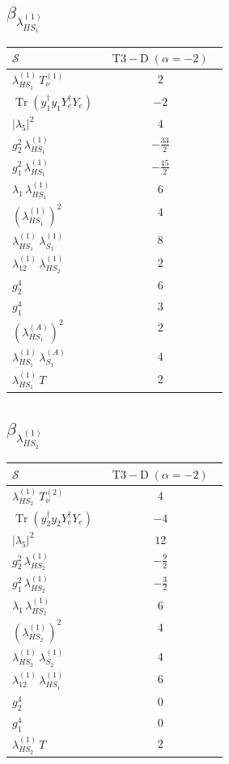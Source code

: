 \documentclass[9pt]{article}
\begin{document}
\subsection*{$ \beta_{\lambda_{HS_1}^{(1)}} $}
\begin{longtable}{@{}p{0.31\linewidth}c@{}}
\toprule
$\mathcal{S}$ & $ \mathrm{T3-D}\;(\alpha=-2) $ \\
\midrule
$ \lambda_{HS_1}^{(1)}\,T_{\nu}^{(1)} $ & $ 2 $ \\
$ \operatorname{Tr}(y_1^\dagger y_1Y_e^\dagger Y_e) $ & $ -2 $ \\
$ |\lambda_5|^2 $ & $ 4 $ \\
$ g_2^2\,\lambda_{HS_1}^{(1)} $ & $ - \frac{33}{2} $ \\
$ g_1^2\,\lambda_{HS_1}^{(1)} $ & $ - \frac{15}{2} $ \\
$ \lambda_1\,\lambda_{HS_1}^{(1)} $ & $ 6 $ \\
$ \left(\lambda_{HS_1}^{(1)}\right)^2 $ & $ 4 $ \\
$ \lambda_{HS_1}^{(1)}\,\lambda_{S_1}^{(1)} $ & $ 8 $ \\
$ \lambda_{12}^{(1)}\,\lambda_{HS_2}^{(1)} $ & $ 2 $ \\
$ g_2^4 $ & $ 6 $ \\
$ g_1^4 $ & $ 3 $ \\
$ \left(\lambda_{HS_1}^{(A)}\right)^2 $ & $ 2 $ \\
$ \lambda_{HS_1}^{(1)}\,\lambda_{S_1}^{(A)} $ & $ 4 $ \\
$ \lambda_{HS_1}^{(1)}\,T $ & $ 2 $ \\
\bottomrule
\end{longtable}
\subsection*{$ \beta_{\lambda_{HS_2}^{(1)}} $}
\begin{longtable}{@{}p{0.31\linewidth}c@{}}
\toprule
$\mathcal{S}$ & $ \mathrm{T3-D}\;(\alpha=-2) $ \\
\midrule
$ \lambda_{HS_2}^{(1)}\,T_{\nu}^{(2)} $ & $ 4 $ \\
$ \operatorname{Tr}(y_2^\dagger y_2Y_e^\dagger Y_e) $ & $ -4 $ \\
$ |\lambda_5|^2 $ & $ 12 $ \\
$ g_2^2\,\lambda_{HS_2}^{(1)} $ & $ - \frac{9}{2} $ \\
$ g_1^2\,\lambda_{HS_2}^{(1)} $ & $ - \frac{3}{2} $ \\
$ \lambda_1\,\lambda_{HS_2}^{(1)} $ & $ 6 $ \\
$ \left(\lambda_{HS_2}^{(1)}\right)^2 $ & $ 4 $ \\
$ \lambda_{HS_2}^{(1)}\,\lambda_{S_2}^{(1)} $ & $ 4 $ \\
$ \lambda_{12}^{(1)}\,\lambda_{HS_1}^{(1)} $ & $ 6 $ \\
$ g_2^4 $ & $ 0 $ \\
$ g_1^4 $ & $ 0 $ \\
$ \lambda_{HS_2}^{(1)}\,T $ & $ 2 $ \\
\bottomrule
\end{longtable}
\end{document}

